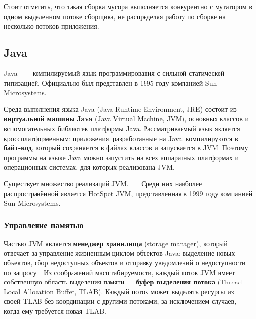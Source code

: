 Стоит отметить, что такая сборка мусора выполняется конкурентно с мутатором в одном выделенном потоке сборщика, не распределяя работу по сборке на несколько потоков приложения.~\cite{python_threaded_gc}


\subsection{Java}

Java~\cite{java_gc_basics} --- компилируемый язык программирования с сильной статической типизацией. Официально был представлен в 1995 году компанией Sun Microsystems. 

Среда выполнения языка Java (Java Runtime Environment, JRE) состоит из \textbf{виртуальной машины Java} (Java Virtual Machine, JVM), основных классов и вспомогательных библиотек платформы Java. Рассматриваемый язык является кроссплатформенным: приложения, разработанные на Java, компилируются в \textbf{байт-код}, который сохраняется в файлах классов и запускается в JVM. Поэтому программы на языке Java можно запустить на всех аппаратных платформах и операционных системах, для которых реализована JVM.~\cite{java_gc_basics}

Существует множество реализаций JVM.~\cite{java_j9}~\cite{java_codename_one}~\cite{java_graalvm}
Среди них наиболее распространённой является HotSpot JVM, представленная в 1999 году компанией Sun Microsystems.~\cite{java_hotspot} %



\subsubsection{Управление памятью}
\label{generations}

Частью JVM является \textbf{менеджер хранилища} (storage manager), который отвечает за управление жизненным циклом объектов Java: выделение новых объектов, сбор недоступных объектов и отправку уведомлений о недоступности по запросу.~\cite{java_storage_management} Из соображений масштабируемости, каждый поток JVM имеет собственную область выделения памяти --- \textbf{буфер выделения потока} (Thread-Local Allocation Buffer, TLAB). Каждый поток может выделять ресурсы из своей TLAB без координации с другими потоками, за исключением случаев, когда ему требуется новая TLAB.~\cite{java_storage_management}

